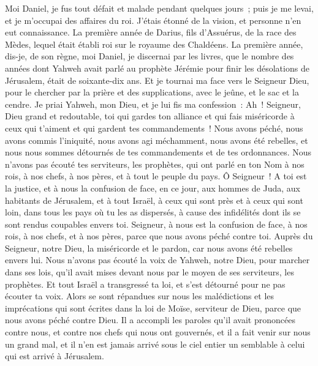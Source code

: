 \begin{multicols}{2}
Moi Daniel, je fus tout défait et malade pendant quelques jours~; puis je me levai, et je m'occupai des affaires du roi. J'étais étonné de la vision, et personne n'en eut connaissance.
\VerseOne{}La première année de Darius, fils d'Assuérus, de la race des Mèdes, lequel était établi roi sur le royaume des Chaldéens.
La première année, dis-je, de son règne, moi Daniel, je discernai par les livres, que le nombre des années dont Yahweh avait parlé au prophète Jérémie pour finir les désolations de Jérusalem, était de soixante-dix ans.
Et je tournai ma face vers le Seigneur Dieu, pour le chercher par la prière et des supplications, avec le jeûne, et le sac et la cendre.
Je priai Yahweh, mon Dieu, et je lui fis ma confession~: Ah~! Seigneur, Dieu grand et redoutable, toi qui gardes ton alliance et qui fais miséricorde à ceux qui t'aiment et qui gardent tes commandements~!
Nous avons péché, nous avons commis l'iniquité, nous avons agi méchamment, nous avons été rebelles, et nous nous sommes détournés de tes commandements et de tes ordonnances.
Nous n'avons pas écouté tes serviteurs, les prophètes, qui ont parlé en ton Nom à nos rois, à nos chefs, à nos pères, et à tout le peuple du pays.
Ô Seigneur~! A toi est la justice, et à nous la confusion de face, en ce jour, aux hommes de Juda, aux habitants de Jérusalem, et à tout Israël, à ceux qui sont près et à ceux qui sont loin, dans tous les pays où tu les as dispersés, à cause des infidélités dont ils se sont rendus coupables envers toi.
Seigneur, à nous est la confusion de face, à nos rois, à nos chefs, et à nos pères, parce que nous avons péché contre toi.
Auprès du Seigneur, notre Dieu, la miséricorde et le pardon, car nous avons été rebelles envers lui.
Nous n'avons pas écouté la voix de Yahweh, notre Dieu, pour marcher dans ses lois, qu'il avait mises devant nous par le moyen de ses serviteurs, les prophètes.
Et tout Israël a transgressé ta loi, et s'est détourné pour ne pas écouter ta voix. Alors se sont répandues sur nous les malédictions et les imprécations qui sont écrites dans la loi de Moïse, serviteur de Dieu, parce que nous avons péché contre Dieu.
Il a accompli les paroles qu'il avait prononcées contre nous, et contre nos chefs qui nous ont gouvernés, et il a fait venir sur nous un grand mal, et il n'en est jamais arrivé sous le ciel entier un semblable à celui qui est arrivé à Jérusalem.

\end{multicols}
